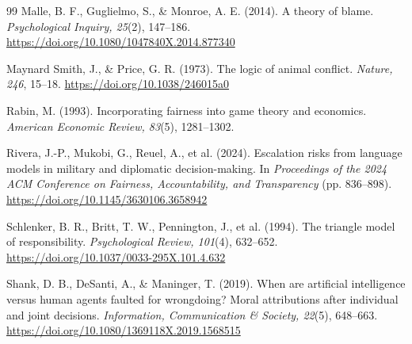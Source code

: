 \documentclass[11pt,a4paper]{article}
\begin{document}
\begin{thebibliography}{99}
Malle, B. F., Guglielmo, S., \& Monroe, A. E. (2014). A theory of blame. \textit{Psychological Inquiry, 25}(2), 147--186. \url{https://doi.org/10.1080/1047840X.2014.877340}

Maynard Smith, J., \& Price, G. R. (1973). The logic of animal conflict. \textit{Nature, 246}, 15--18. \url{https://doi.org/10.1038/246015a0}

Rabin, M. (1993). Incorporating fairness into game theory and economics. \textit{American Economic Review, 83}(5), 1281--1302.

Rivera, J.-P., Mukobi, G., Reuel, A., et al. (2024). Escalation risks from language models in military and diplomatic decision-making. In \textit{Proceedings of the 2024 ACM Conference on Fairness, Accountability, and Transparency} (pp. 836--898). \url{https://doi.org/10.1145/3630106.3658942}

Schlenker, B. R., Britt, T. W., Pennington, J., et al. (1994). The triangle model of responsibility. \textit{Psychological Review, 101}(4), 632--652. \url{https://doi.org/10.1037/0033-295X.101.4.632}

Shank, D. B., DeSanti, A., \& Maninger, T. (2019). When are artificial intelligence versus human agents faulted for wrongdoing? Moral attributions after individual and joint decisions. \textit{Information, Communication \& Society, 22}(5), 648--663. \url{https://doi.org/10.1080/1369118X.2019.1568515}

\end{thebibliography}
\endgroup
\end{document}
